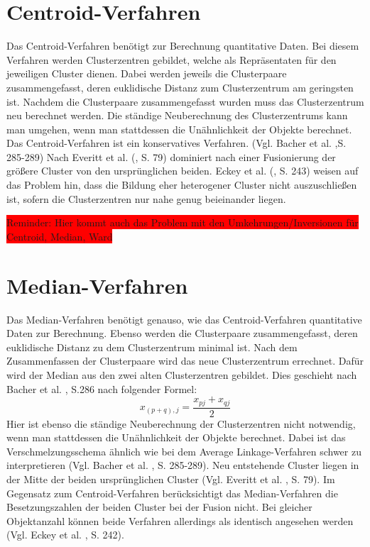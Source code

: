 \section{Centroid-Verfahren}
Das Centroid-Verfahren benötigt zur Berechnung quantitative Daten. Bei diesem Verfahren werden Clusterzentren gebildet, welche als Repräsentaten für den jeweiligen Cluster dienen. Dabei werden jeweils die Clusterpaare zusammengefasst, deren euklidische Distanz zum Clusterzentrum am geringsten ist. Nachdem die Clusterpaare zusammengefasst wurden muss das Clusterzentrum neu berechnet werden. Die ständige Neuberechnung des Clusterzentrums kann man umgehen, wenn man stattdessen die Unähnlichkeit der Objekte berechnet. Das Centroid-Verfahren ist ein konservatives Verfahren. (Vgl. Bacher et al. \cite{Bacher.2010},S. 285-289) Nach Everitt et al. (\cite{Everitt.2011}, S. 79) dominiert nach einer Fusionierung der größere Cluster von den ursprünglichen beiden.
Eckey et al. (\cite{Eckey.2002}, S. 243) weisen auf das Problem hin, dass die Bildung eher heterogener Cluster nicht auszuschließen ist, sofern die Clusterzentren nur nahe genug beieinander liegen.

\colorbox{red}{Reminder: Hier kommt auch das Problem mit den Umkehrungen/Inversionen für Centroid, Median, Ward}

\section{Median-Verfahren}
Das Median-Verfahren benötigt genauso, wie das Centroid-Verfahren quantitative Daten zur Berechnung. Ebenso werden die Clusterpaare zusammengefasst, deren euklidische Distanz zu dem Clusterzentrum minimal ist. Nach dem Zusammenfassen der Clusterpaare wird das neue Clusterzentrum errechnet. Dafür wird der Median aus den zwei alten Clusterzentren gebildet. Dies geschieht nach Bacher et al. \cite{Bacher.2010}, S.286 nach folgender Formel:
\begin{equation}
	x_{(p+q),j} = \frac{x_{pj} + x_{qj}}{2}
\end{equation}
Hier ist ebenso die ständige Neuberechnung der Clusterzentren nicht notwendig, wenn man stattdessen die Unähnlichkeit der Objekte berechnet. Dabei ist das Verschmelzungsschema ähnlich wie bei dem Average Linkage-Verfahren schwer zu interpretieren (Vgl. Bacher et al. \cite{Bacher.2010}, S. 285-289). Neu entstehende Cluster liegen in der Mitte der beiden ursprünglichen Cluster (Vgl. Everitt et al. \cite{Everitt.2011}, S. 79).
Im Gegensatz zum Centroid-Verfahren berücksichtigt das Median-Verfahren die Besetzungszahlen der beiden Cluster bei der Fusion nicht. Bei gleicher Objektanzahl können beide Verfahren allerdings als identisch angesehen werden (Vgl. Eckey et al. \cite{Eckey.2002}, S. 242).

